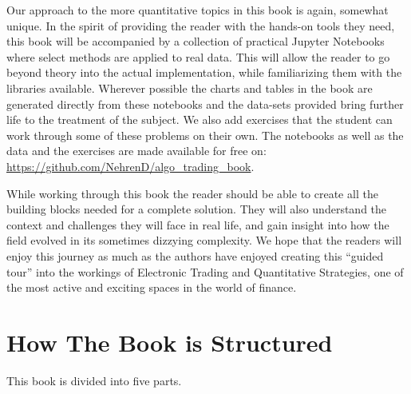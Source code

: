 Our approach to the more quantitative topics in this book is again, somewhat unique. In the spirit of providing the reader with the hands-on tools they need, this book will be accompanied by a collection of practical Jupyter Notebooks where select methods are applied to real data. This will allow the reader to go beyond theory into the actual implementation, while familiarizing them with the libraries available. Wherever possible the charts and tables in the book are generated directly from these notebooks and the data-sets provided bring further life to the treatment of the subject. We also add  exercises that the student can work through some of these problems on their own. The notebooks as well as the data and the exercises are made  available for free on: \url{https://github.com/NehrenD/algo_trading_book}.


While working through this book the reader should be able to create all the building blocks needed for a complete solution. They will also understand the context and challenges they will face in real life, and gain insight into how the field evolved in its sometimes dizzying complexity. We hope that the readers will enjoy this journey as much as the authors have enjoyed creating this ``guided tour'' into the workings of Electronic Trading and Quantitative Strategies, one of the most active and exciting spaces in the world of finance.

\section{How The Book is Structured}

This book is divided into five parts. 

